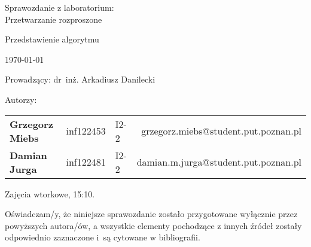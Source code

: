 \thispagestyle{empty} %

\begin{center}
{\large{Sprawozdanie z laboratorium:\\
Przetwarzanie rozproszone}}

\vspace{3ex}

Przedstawienie algorytmu

\vspace{3ex}
{\footnotesize\today}

\end{center}


\vspace{10ex}

Prowadzący: dr~inż. Arkadiusz Danilecki

\vspace{5ex}

Autorzy:
\begin{tabular}{lllr}
\textbf{Grzegorz Miebs} & inf122453 & I2-2 & grzegorz.miebs@student.put.poznan.pl \\
\textbf{Damian Jurga} & inf122481 & I2-2 & damian.m.jurga@student.put.poznan.pl \\
\end{tabular}

\vspace{5ex}

Zajęcia wtorkowe, 15:10.

\vspace{35ex}

\noindent Oświadczam/y, że niniejsze sprawozdanie zostało przygotowane wyłącznie przez powyższych autora/ów,
a wszystkie elementy pochodzące z innych źródeł zostały odpowiednio zaznaczone i~są cytowane w bibliografii.  

\newpage

